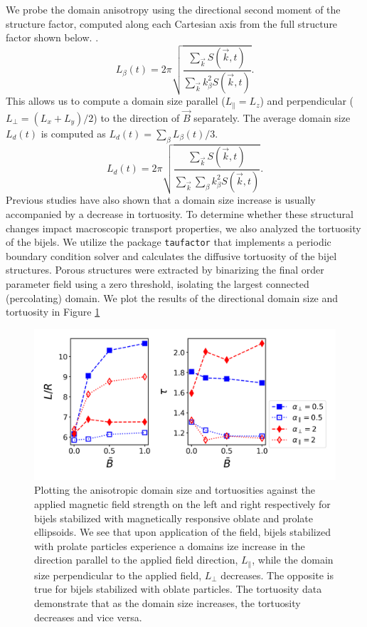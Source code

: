 We probe the domain anisotropy using the directional second moment of the structure factor, computed along each Cartesian axis from the full structure factor shown
below. \cite{jansen_bijels_2011, gunther_timescales_2014}. 
    \begin{equation}
    L_\beta(t)=2\pi\sqrt{\frac{\sum_{\vec{k}}S(\vec{k},t)}{\sum_{\vec{k}}k_\beta^2 S(\vec{k},t)}} .
    \end{equation}
    This allows us to compute a domain size parallel
    (\(L_\parallel=L_z\)) and perpendicular (\(L_\perp=(L_x+L_y)/2\)) to the
    direction of \(\vec{B}\) separately. The average domain size \(L_d(t)\)
    is computed as \(L_d(t)=\sum_\beta L_\beta(t) / 3\).
    \begin{equation}
    L_d(t)=2\pi\sqrt{\frac{\sum_{\vec{k}}S(\vec{k},t)}{\sum_{\vec{k}}\sum_\beta k_\beta^2 S(\vec{k},t)}} .
    \end{equation}
Previous studies have also shown that a domain size increase is usually accompanied by a decrease in
tortuosity. \cite{karthikeyan_formation_2024} To determine whether these structural 
changes impact macroscopic transport properties, we also analyzed the tortuosity of the bijels. We utilize the package \texttt{taufactor} that implements
a periodic boundary condition solver and calculates the diffusive tortuosity of the bijel structures. Porous structures were 
extracted by binarizing the final order parameter field using a zero threshold, isolating the largest connected (percolating) domain. We plot the results of
the directional domain size and tortuosity in Figure \ref{fig:domain_size_aniso-field_on}

\begin{figure} 
    \centering 
    \includegraphics[scale=0.6]{../figures/results/paper2/domain_size_aniso-field_on.png} 
    \caption{Plotting the anisotropic domain size and tortuosities against the applied magnetic field strength on the left and right respectively for bijels 
             stabilized with magnetically responsive oblate and prolate ellipsoids. We see that upon application of the field, bijels stabilized with prolate 
             particles experience a domains ize increase in the direction parallel to the applied field direction, $L_{\parallel}$, while the domain size 
             perpendicular to the applied field, $L_{\perp}$ decreases. The opposite is true for bijels stabilized with oblate particles. The tortuosity data 
             demonstrate that as the domain size increases, the tortuosity decreases and vice versa.} 
    \label{fig:domain_size_aniso-field_on} 
\end{figure}

